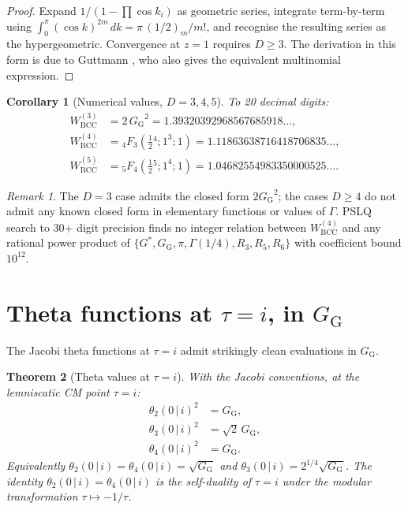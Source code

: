 \documentclass[11pt]{article}
\newtheorem{theorem}{Theorem}[section]
\newtheorem{corollary}[theorem]{Corollary}
\theoremstyle{definition}
\theoremstyle{remark}
\newtheorem*{remark}{Remark}
\newcommand{\Gs}{G^{*}}
\newcommand{\GG}{G_{\!\scriptscriptstyle\mathrm{G}}}
\begin{document}
\begin{proof}
Expand $1/(1 - \prod \cos k_i)$ as geometric series, integrate term-by-term
using $\int_0^\pi (\cos k)^{2m}\,dk = \pi\,(1/2)_m/m!$, and recognise the
resulting series as the hypergeometric. Convergence at $z = 1$ requires
$D \geq 3$. The derivation in this form is due to Guttmann
\cite[\S2.1]{guttmann2010}, who also gives the equivalent multinomial expression.
\end{proof}

\begin{corollary}[Numerical values, $D = 3, 4, 5$]\label{cor:WD-numerics}
To 20 decimal digits:
\begin{align*}
W^{(3)}_{\mathrm{BCC}} &= 2\,{\GG}^2 = 1.39320392968567685918\ldots, \\
W^{(4)}_{\mathrm{BCC}} &= {}_4F_3(\tfrac12{}^4; 1^3; 1) = 1.11863638716418706835\ldots, \\
W^{(5)}_{\mathrm{BCC}} &= {}_5F_4(\tfrac12{}^5; 1^4; 1) = 1.04682554983350000525\ldots.
\end{align*}
\end{corollary}

\begin{remark}
The $D = 3$ case admits the closed form $2{\GG}^2$; the cases $D \geq 4$ do not
admit any known closed form in elementary functions or values of $\Gamma$.
PSLQ search to 30+ digit precision finds no integer relation between
$W^{(4)}_{\mathrm{BCC}}$ and any rational power product of
$\{\Gs, \GG, \pi, \Gamma(1/4), R_3, R_5, R_6\}$ with coefficient bound
$10^{12}$.
\end{remark}

\section{Theta functions at $\tau = i$, in $\GG$}\label{sec:theta}

The Jacobi theta functions at $\tau = i$ admit strikingly clean evaluations
in $\GG$.

\begin{theorem}[Theta values at $\tau = i$]\label{thm:theta-values}
With the Jacobi conventions, at the lemniscatic CM point $\tau = i$:
\begin{align}
\theta_2(0\,|\,i)^2 &= \GG, \label{eq:theta2sq}\\
\theta_3(0\,|\,i)^2 &= \sqrt{2}\,\GG, \label{eq:theta3sq}\\
\theta_4(0\,|\,i)^2 &= \GG. \label{eq:theta4sq}
\end{align}
Equivalently $\theta_2(0\,|\,i) = \theta_4(0\,|\,i) = \sqrt{\GG}$ and
$\theta_3(0\,|\,i) = 2^{1/4}\sqrt{\GG}$. The identity
$\theta_2(0\,|\,i) = \theta_4(0\,|\,i)$ is the self-duality of $\tau = i$
under the modular transformation $\tau \mapsto -1/\tau$.
\end{theorem}
\end{document}
